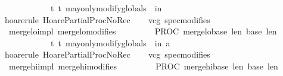 \begin{isabellebody}
\ \ \ \ \ \ \ \ \ \ \ \ {\isacharbraceleft}t{\isachardot}\ t\ may{\isacharunderscore}only{\isacharunderscore}modify{\isacharunderscore}globals\ {\isasymsigma}\ in\ {\isacharbrackleft}{\isacharbrackright}{\isacharbraceright}{\isachardoublequoteclose}\isanewline
%
\isadelimproof
\ \ %
\endisadelimproof
%
\isatagproof
{}\isamarkupfalse%
\ {\isacharparenleft}hoare{\isacharunderscore}rule\ HoarePartial{\isachardot}ProcNoRec{}{\isacharparenright}\isanewline
\ \ \isamarkupfalse%
\ {\isacharparenleft}vcg\ spec{\isacharequal}modifies{\isacharparenright}\isanewline
\ \ \isamarkupfalse%
%
\endisatagproof
{\isafoldproof}%
%
\isadelimproof
\isanewline
%
\endisadelimproof
\isanewline
{}\isamarkupfalse%
\ {\isacharparenleft}\ merge{\isacharunderscore}lo{\isacharunderscore}impl{\isacharparenright}\ merge{\isacharunderscore}lo{\isacharunderscore}modifies{\isacharcolon}\isanewline
\ \ \isanewline
\ \ {\isachardoublequoteopen}{\isasymforall}\ {\isasymsigma}{\isachardot}\ {\isasymGamma}{\isasymturnstile}\ {\isacharbraceleft}{\isasymsigma}{\isacharbraceright}\ PROC\ merge{\isacharunderscore}lo{\isacharparenleft}{\isasymacute}base{}{\isacharcomma}\ {\isasymacute}len{}{\isacharcomma}\ {\isasymacute}base{}{\isacharcomma}\ {\isasymacute}len{}{\isacharparenright}\isanewline
\ \ \ \ \ \ \ \ \ \ \ \ {\isacharbraceleft}t{\isachardot}\ t\ may{\isacharunderscore}only{\isacharunderscore}modify{\isacharunderscore}globals\ {\isasymsigma}\ in\ {\isacharbrackleft}a{\isacharbrackright}{\isacharbraceright}{\isachardoublequoteclose}\isanewline
%
\isadelimproof
\ \ %
\endisadelimproof
%
\isatagproof
{}\isamarkupfalse%
\ {\isacharparenleft}hoare{\isacharunderscore}rule\ HoarePartial{\isachardot}ProcNoRec{}{\isacharparenright}\isanewline
\ \ \isamarkupfalse%
\ {\isacharparenleft}vcg\ spec{\isacharequal}modifies{\isacharparenright}\isanewline
\ \ \isamarkupfalse%
%
\endisatagproof
{\isafoldproof}%
%
\isadelimproof
\isanewline
%
\endisadelimproof
\isanewline
{}\isamarkupfalse%
\ {\isacharparenleft}\ merge{\isacharunderscore}hi{\isacharunderscore}impl{\isacharparenright}\ merge{\isacharunderscore}hi{\isacharunderscore}modifies{\isacharcolon}\isanewline
\ \ \isanewline
\ \ {\isachardoublequoteopen}{\isasymforall}\ {\isasymsigma}{\isachardot}\ {\isasymGamma}{\isasymturnstile}\ {\isacharbraceleft}{\isasymsigma}{\isacharbraceright}\ PROC\ merge{\isacharunderscore}hi{\isacharparenleft}{\isasymacute}base{}{\isacharcomma}\ {\isasymacute}len{}{\isacharcomma}\ {\isasymacute}base{}{\isacharcomma}\ {\isasymacute}len{}{\isacharparenright}\isanewline

\end{isabellebody}

